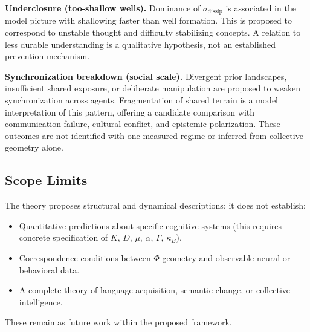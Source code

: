 \textbf{Underclosure (too-shallow wells).}
Dominance of $\sigma_{\mathrm{dissip}}$ is associated in the model
picture with shallowing faster than well formation.
This is proposed to correspond to unstable thought and difficulty
stabilizing concepts. A relation to less durable understanding is a
qualitative hypothesis, not an established prevention mechanism.

\textbf{Synchronization breakdown (social scale).}
Divergent prior landscapes, insufficient shared exposure, or deliberate
manipulation are proposed to weaken synchronization across agents.
Fragmentation of shared terrain is a model interpretation of this pattern,
offering a candidate comparison with communication failure, cultural
conflict, and epistemic polarization. These outcomes are not identified
with one measured regime or inferred from collective geometry alone.

\subsection{Scope Limits}

The theory proposes structural and dynamical descriptions; it does
not establish:
\begin{itemize}
  \item Quantitative predictions about specific cognitive systems
        (this requires concrete specification of $K$, $D$, $\mu$,
        $\alpha$, $\Gamma$, $\kappa_B$).
  \item Correspondence conditions between $\Phi$-geometry and
        observable neural or behavioral data.
  \item A complete theory of language acquisition, semantic change,
        or collective intelligence.
\end{itemize}
These remain as future work within the proposed framework.
